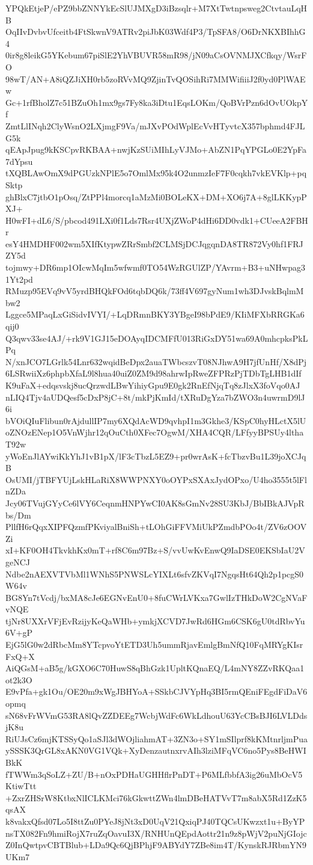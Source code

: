 YPQkEtjeP/ePZ9bbZNNYkEcSlUJMXgD3iBzsqlr+M7XtTwtnpsweg2CtvtauLqHB
OqIIvDvbvUfceitb4FtSkwnV9ATRv2piJbK03Wdf4P3/TpSFA8/O6DrNKXBIhhG4
0ir8g8leikG5YKebum67piSlE2YhVBUVR58mR98/jN09aCsOVNMJXCfkqy/WsrFO
98wT/AN+A8iQZJiXH0rb5zoRVvMQ9ZjinTvQOSihRi7MMWifiiiJ2f0yd0PlWAEw
Gc+1rfBholZ7c51BZuOh1mx9gs7Fy8ka3iDtu1EqsLOKm/QoBVrPzn6dOvUOkpYf
ZmtLlINqh2ClyWsnO2LXjmgF9Va/mJXvPOdWplEcVvHTyvtcX357bphmd4FJLG5k
qEApJpug9kKSCpvRKBAA+nwjKzSUiMIhLyVJMo+AbZN1PqYPGLo0E2YpFa7dYpsu
tXQBLAwOmX9dPGUzkNPlE5o7OmlMx95k4O2unmzIeF7F0cqkh7vkEVKlp+pqSktp
ghBlxC7jtbO1pOsq/ZtPPl4morcq1aMzMi0BOLeKX+DM+XO6j7A+8glLKKypPXJ+
H0wFI+dL6/S/pbcod491LXi0f1Lds7Rsr4UXjZWoP4dHi6DD0vdk1+CUeeA2FBHr
esY4HMDHF002wm5XIfKtypwZRrSmbf2CLMSjDCJqgqnDA8TR872Vy0hf1FRJZY5d
tojmwy+DR6mp1OIcwMqIm5wfwmf0TO54WzRGUlZP/YAvrm+B3+uNHwpag31Yt2pd
RMuzp95EVq9vV5yrdBHQkFOd6tqbDQ6k/73ff4V697gyNum1wh3DJvskBqlmMbw2
Lggce5MPaqLxGiSidvIVYI/+LqDRmnBKY3YBgeI98bPdE9/KIiMFXbRRGKa6qij0
Q3qwv33se4AJ/+rk9V1GJ15eDOAyqIDCMFfU013RiGxDY51wa69A0mhcpksPkLPq
N/xnJCO7LGrlk54Lnr632wqidBeDpx2auaTWbcszvT08NJhwA9H7jfUnHf/X8dPj
6LSRwiiXz6phpbXfaL9l8hua40uiZ0ZM9d98ahrwIpRweZFPRzPjTDbTgLHB1dIf
K9uFaX+edqsvskj8ucQrzwdLBwYihiyGpu9E0gk2RnEfNjqTq8zJlxX3foVqo0AJ
nLIQ4Tjv4aUDQesf5cDxP8jC+8t/mkPjKmId/tXRuDgYza7bZWO3n4uwrmD9lJ6i
bVOiQIuFlibun0rAjdullIP7my6XQdAcWD9qvhpI1m3Gkhe3/KSpC0hyHLctX5lU
oZNOzENep1O5VnWjhr12qOuCth0XFec7OgwM/XHA4CQR/LFfyyBPSUy4lthaT92w
yWoEnJlAYwiKkYhJ1vB1pX/lF3cTbzL5EZ9+pr0wrAsK+fcTbzvBu1L39joXCJqB
OsUMI/jTBFYUjLskHLaRiX8WWPNXY0oOYPxSXAxJydOPxo/U4ho3555t5lFlnZDa
Jcy06TVujGYyCe6lVY6CeqnmHNPYwCI0AK8sGmNv28SU3KbJ/BbIBkAJVpRbs/Dm
PllfH6rQqxXIPFQzmfPKviyalBniSh+tLOhGiFFVMiUkPZmdbPOo4t/ZV6zOOVZi
xI+KF0OH4TkvkhKx0mT+rf8C6m97Bz+S/vvUwKvEnwQ9IaDSE0EKSbIaU2VgeNCJ
Ndbe2nAEXVTVbMl1WNhS5PNWSLcYIXLt6sfvZKVqI7NgqsHt64Qh2p1pcgS0W64v
BG8Yn7tVcdj/bxMA8cJe6EGNvEnU0+8fuCWrLVKxa7GwlIzTHkDoW2CgNVaFvNQE
tjNr8UXXrVFjEvRzijyKeQaWHb+ymkjXCVD7JwRd6HGm6CSK6gU0tdRbvYu6V+gP
EjG5lG0w2dRbcMm8YTcpvoYtETD3Uh5ummRjavEmlgBmNfQ10FqMRYgKIsrFxQ+X
AiQGsM+aB5g/kGXO6C70HuwS8qBhGzk1UpltKQnaEQ/L4mNY8ZZvRKQaa1ot2k3O
E9vPfa+gk1Ou/OE20m9xWgJBHYoA+SSkbCJVYpHq3BI5rmQEniFEgdFiDaV6opmq
sN68vFrWVmG53RA8lQvZZDEEg7WcbjWdFc6WkLdhouU63YcCBsBJI6LVLDdsjK8u
RiUJsCz6mjKTSSyQo1aSJl3dWOjliahmAT+3ZN3o+SY1mSIlprf8kKMtnrljmPua
ySSSK3QrGL8xAKN0VG1VQk+XyDenzautnxrvAIh3lziMFqVC6no5Pys8BeHWIBkK
fTWWm3qSoLZ+ZU/B+nOxPDHaUGHHflrPnDT+P6MLfbbfA3ig26uMbOcV5KtiwTtt
+ZxrZHSrW8KtbxNlICLKMci76kGkwttZWn4lmDBeHATVvT7m8abX5Rd1ZzK5qsAX
k8vakxQfsd07Lo5I8ttZu0PYeJ8jNt3xD0UqV21QxiqPJ40TQCsUKwzxt1u+ByYP
nsTX082Fn9hmiRojX7ruZqOavuI3X/RNHUnQEpdAottr21n9z8pWjV2puNjGIojc
Z0InQwtpvCBTBlub+LDa9Qc6QjBPhjF9ABYdY7ZBe8im4T/KynskRJRbmYN9UKm7
